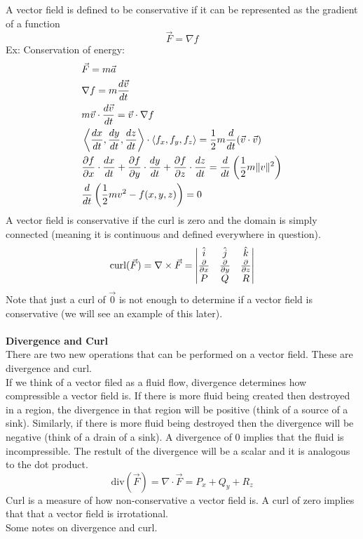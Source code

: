 \documentclass[11pt, fleqn]{article}
\begin{document}
A vector field is defined to be conservative if it can be represented as the gradient of a function
$$\vec{F}=\nabla f$$
Ex: Conservation of energy:
\begin{align*}
    &\vec{F}=m\vec{a}\\
    &\nabla f=m\frac{d\vec{v}}{dt}\\
    &m\vec{v}\cdot\frac{d\vec{v}}{dt}=\vec{v}\cdot\nabla f\\
    &\left\langle \frac{dx}{dt},\frac{dy}{dt},\frac{dz}{dt} \right\rangle\cdot\left\langle f_x,f_y,f_z \right\rangle=\frac{1}{2}m\frac{d}{dt}(\vec{v}\cdot\vec{v})\\
    &\frac{\partial f}{\partial x}\cdot\frac{dx}{dt}+\frac{\partial f}{\partial y}\cdot\frac{dy}{dt}+\frac{\partial f}{\partial z}\cdot\frac{dz}{dt}=\frac{d}{dt}\left( \frac{1}{2}m\|v\|^2 \right)\\
    &\frac{d}{dt}\left( \frac{1}{2}mv^2-f(x,y,z) \right)=0
\end{align*}
A vector field is conservative if the curl is zero and the domain is simply connected (meaning it is continuous and defined everywhere in question).\\
$$\text{curl}(\vec{F})=\nabla\times\vec{F}=\left|\begin{matrix} \hat{i}&\hat{j}&\hat{k}\\\frac{\partial}{\partial x}&\frac{\partial}{\partial y}&\frac{\partial}{\partial z}\\P&Q&R \end{matrix}\right|$$
Note that just a curl of $\vec{0}$ is not enough to determine if a vector field is conservative (we will see an example of this later).\\
\\
\textbf{Divergence and Curl}\\
There are two new operations that can be performed on a vector field. These are divergence and curl.\\
If we think of a vector filed as a fluid flow, divergence determines how compressible a vector field is. If there is more fluid being created then destroyed in a region, the divergence in that region will be positive (think of a source of a sink). Similarly, if there is more fluid being destroyed then the divergence will be negative (think of a drain of a sink). A divergence of 0 implies that the fluid is incompressible. The restult of the divergence will be a scalar and it is analogous to the dot product.
$$\text{div}(\vec{F})=\nabla\cdot\vec{F}=P_x+Q_y+R_z$$
Curl is a measure of how non-conservative a vector field is. A curl of zero implies that that a vector field is irrotational.\\
Some notes on divergence and curl.
\end{document}
